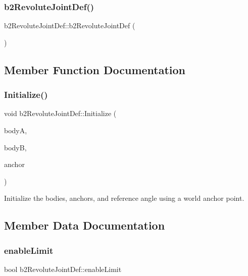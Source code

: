 \subsubsection{\texorpdfstring{b2RevoluteJointDef()}{b2RevoluteJointDef()}}
{\footnotesize\ttfamily b2\+Revolute\+Joint\+Def\+::b2\+Revolute\+Joint\+Def (\begin{DoxyParamCaption}{ }\end{DoxyParamCaption})\hspace{0.3cm}{\ttfamily [inline]}}



\subsection{Member Function Documentation}
\mbox{\label{structb2_revolute_joint_def_a6401b2a663533415d032a525e4fa2806}} 
\subsubsection{\texorpdfstring{Initialize()}{Initialize()}}
{\footnotesize\ttfamily void b2\+Revolute\+Joint\+Def\+::\+Initialize (\begin{DoxyParamCaption}\item[{\mbox{\hyperlink{classb2_body}{b2\+Body}} $\ast$}]{bodyA,  }\item[{\mbox{\hyperlink{classb2_body}{b2\+Body}} $\ast$}]{bodyB,  }\item[{const \mbox{\hyperlink{structb2_vec2}{b2\+Vec2}} \&}]{anchor }\end{DoxyParamCaption})}

Initialize the bodies, anchors, and reference angle using a world anchor point. 

\subsection{Member Data Documentation}
\mbox{\label{structb2_revolute_joint_def_a2eaefc5fc5caf879cfd59ebcd852b756}} 
\subsubsection{\texorpdfstring{enableLimit}{enableLimit}}
{\footnotesize\ttfamily bool b2\+Revolute\+Joint\+Def\+::enable\+Limit}




